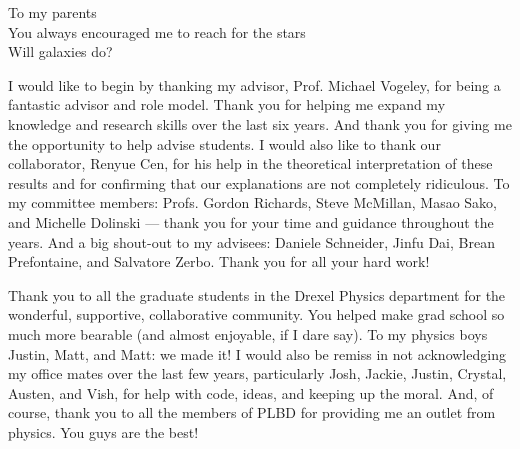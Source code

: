 \begin{preamble}

\iffinal{}{\newpage}


\begin{DUTdedications}
\begin{center}
To my parents\\
You always encouraged me to reach for the stars\\
Will galaxies do?
\end{center}
\end{DUTdedications}

\iffinal{}{\newpage}


\begin{acknowledgments}

I would like to begin by thanking my advisor, Prof. Michael Vogeley, for being a 
fantastic advisor and role model.  Thank you for helping me expand my knowledge 
and research skills over the last six years.  And thank you for giving me the 
opportunity to help advise students.  I would also like to thank our 
collaborator, Renyue Cen, for his help in the theoretical interpretation of 
these results and for confirming that our explanations are not completely 
ridiculous.  To my committee members: Profs. Gordon Richards, Steve McMillan, 
Masao Sako, and Michelle Dolinski --- thank you for your time and guidance 
throughout the years.  And a big shout-out to my advisees: Daniele Schneider, 
Jinfu Dai, Brean Prefontaine, and Salvatore Zerbo.  Thank you for all your hard 
work!

Thank you to all the graduate students in the Drexel Physics department for the 
wonderful, supportive, collaborative community.  You helped make grad school so 
much more bearable (and almost enjoyable, if I dare say).  To my physics boys 
Justin, Matt, and Matt: we made it!  I would also be remiss in not acknowledging 
my office mates over the last few years, particularly Josh, Jackie, Justin, 
Crystal, Austen, and Vish, for help with code, ideas, and keeping up the moral.  
And, of course, thank you to all the members of PLBD for providing me an outlet 
from physics.  You guys are the best!


\end{acknowledgments}
\end{preamble}
